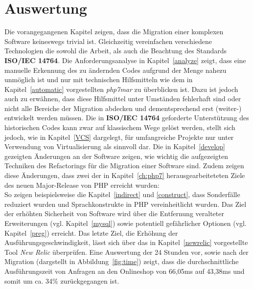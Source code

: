 \chapter{Auswertung}\label{ch:end} 

Die vorangegangenen Kapitel zeigen, dass die Migration einer komplexen Software keineswegs trivial ist. Gleichzeitig vereinfachen verschiedene Technologien die 
sowohl die Arbeit, als auch die Beachtung des Standards \textbf{ISO/IEC 14764}. Die Anforderungsanalyse in Kapitel~\ref{analyze} zeigt, dass eine manuelle Erkennung 
des zu ändernden Codes aufgrund der Menge nahezu unmöglich ist und nur mit technischen Hilfsmitteln wie dem in Kapitel~\ref{automatic} vorgestellten \textit{php7mar} 
zu überblicken ist. Dazu ist jedoch auch zu erwähnen, dass diese Hilfsmittel unter Umständen fehlerhaft sind oder nicht alle Bereiche der Migration abdecken und 
dementsprechend erst (weiter-) entwickelt werden müssen. Die in \textbf{ISO/IEC 14764} geforderte Unterstützung des historischen Codes kann zwar auf klassischem Wege 
gelöst werden, stellt sich jedoch, wie in Kapitel~\ref{VCS} dargelegt, für umfangreiche Projekte nur unter Verwendung von Virtualisierung als sinnvoll dar. 
Die in Kapitel~\ref{develop} gezeigten Änderungen an der Software zeigen, wie wichtig die aufgezeigten Techniken des Refactorings für die Migration einer Software sind.
Zudem zeigen diese Änderungen, dass zwei der in Kapitel~\ref{ch:php7} herausgearbeiteteten Ziele des neuen Major-Release von \ac{PHP} erreicht wurden: \\
So zeigen beispielsweise die Kapitel~\ref{indirect} und \ref{construct}, dass Sonderfälle reduziert wurden und Sprachkonstrukte in \ac{PHP} vereinheitlicht wurden. 
Das Ziel der erhöhten Sicherheit von Software wird über die Entfernung veralteter Erweiterungen (vgl. Kapitel~\ref{mysql}) sowie potentiell gefährlicher Optionen (vgl. Kapitel~\ref{preg}) 
erreicht. Das letzte Ziel, die Erhöhung der Ausführungsgeschwindigkeit, lässt sich über das in Kapitel~\ref{newrelic} vorgestellte Tool \textit{New Relic} überprüfen. 
Eine Auswertung der 24 Stunden vor, sowie nach der Migration (dargstellt in Abbildung~\ref{fig:time}) zeigt, dass die durchschnittliche Ausführungszeit von Anfragen an den Onlineshop 
von 66,05ms auf 43,38ms und somit um ca. 34\% zurückgegangen ist.

